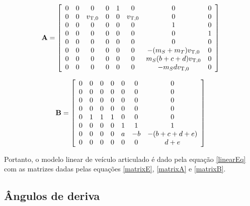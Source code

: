 \documentclass[sublist]{fei}
\begin{document}
\begin{equation} \label{matrixA}
{\bf A} = \left[ \begin{array}{cccccccc} 0 & 0 &  0 & 0 & 1 &  0 &                 0 & 0 \\
                                0 & 0 & v_{{\rm T},0} & 0 & 0 & v_{{\rm T},0} &                 0 & 0 \\
                                0 & 0 &  0 & 0 & 0 &  0 &                 1 & 0 \\
                                0 & 0 &  0 & 0 & 0 &  0 &                 0 & 1 \\
                                0 & 0 &  0 & 0 & 0 &  0 &                 0 & 0 \\
                                0 & 0 &  0 & 0 & 0 &  0 &     -(m_S + m_T) v_{{\rm T},0} & 0 \\
                                0 & 0 &  0 & 0 & 0 &  0 & m_S (b + c + d) v_{{\rm T},0} & 0 \\
                                0 & 0 &  0 & 0 & 0 &  0 &          - m_S d v_{{\rm T},0} & 0 \end{array} \right]
\end{equation}

\begin{equation} \label{matrixB}
    {\bf B} = \left[ \begin{array}{cccccccc}
0 & 0 & 0 & 0 & 0 &  0 &               0 \\
0 & 0 & 0 & 0 & 0 &  0 &               0 \\
0 & 0 & 0 & 0 & 0 &  0 &               0 \\
0 & 0 & 0 & 0 & 0 &  0 &               0 \\
0 & 1 & 1 & 1 & 0 &  0 &               0 \\
0 & 0 & 0 & 0 & 1 &  1 &               1 \\
0 & 0 & 0 & 0 & a & - b & - (b + c + d + e) \\
0 & 0 & 0 & 0 & 0 &  0 &           d + e \end{array} \right]
\end{equation}

Portanto, o modelo linear de veículo articulado é dado pela equação \eqref{linearEq} com as matrizes dadas pelas equações \eqref{matrixE}, \eqref{matrixA} e \eqref{matrixB}.


\subsection{Ângulos de deriva}
\end{document}
